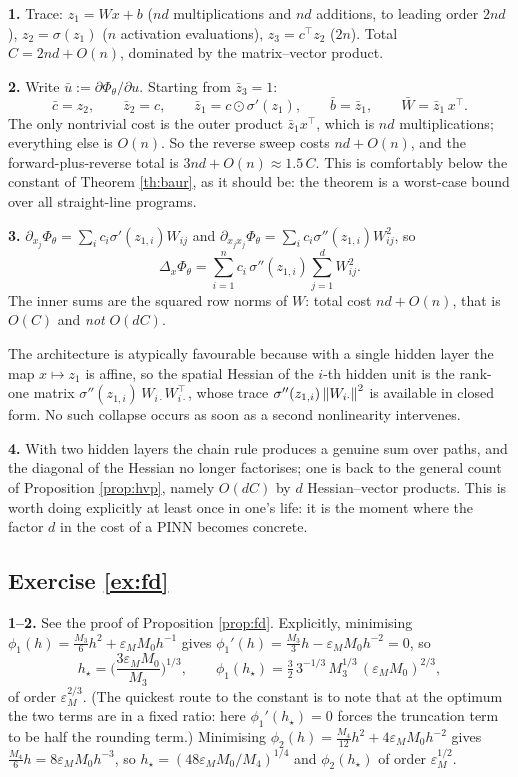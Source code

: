 \documentclass[11pt,a4paper]{article}
\begin{document}
\textbf{1.} Trace: $z_1 = Wx + b$ ($nd$ multiplications and $nd$ additions, to leading order $2nd$),
$z_2 = \sigma(z_1)$ ($n$ activation evaluations), $z_3 = c^{\!\top}z_2$ ($2n$). Total
$C = 2nd + O(n)$, dominated by the matrix--vector product.

\textbf{2.} Write $\bar u := \partial\Phi_\theta/\partial u$. Starting from $\bar z_3 = 1$:
\[
\bar c = z_2, \qquad \bar z_2 = c, \qquad \bar z_1 = c \odot \sigma'(z_1), \qquad
\bar b = \bar z_1, \qquad \bar W = \bar z_1\, x^{\!\top}.
\]
The only nontrivial cost is the outer product $\bar z_1 x^{\!\top}$, which is $nd$ multiplications;
everything else is $O(n)$. So the reverse sweep costs $nd + O(n)$, and the forward-plus-reverse
total is $3nd + O(n) \approx 1.5\,C$. This is comfortably below the constant of Theorem
\ref{th:baur}, as it should be: the theorem is a worst-case bound over all straight-line programs.

\textbf{3.} $\partial_{x_j}\Phi_\theta = \sum_i c_i \sigma'(z_{1,i})W_{ij}$ and
$\partial_{x_jx_j}\Phi_\theta = \sum_i c_i\sigma''(z_{1,i})W_{ij}^2$, so
\[
\Delta_x\Phi_\theta = \sum_{i=1}^n c_i\, \sigma''(z_{1,i}) \sum_{j=1}^d W_{ij}^2 .
\]
The inner sums are the squared row norms of $W$: total cost $nd + O(n)$, that is $O(C)$ and
\emph{not} $O(dC)$.

The architecture is atypically favourable because with a single hidden layer the map
$x \mapsto z_1$ is affine, so the spatial Hessian of the $i$-th hidden unit is the rank-one matrix
$\sigma''(z_{1,i})\,W_{i\cdot}W_{i\cdot}^{\!\top}$, whose trace
$\sigma''(z_{1,i})\left\lVert W_{i\cdot} \right\rVert^2$ is available in closed form. No such collapse occurs as
soon as a second nonlinearity intervenes.

\textbf{4.} With two hidden layers the chain rule produces a genuine sum over paths, and the
diagonal of the Hessian no longer factorises; one is back to the general count of Proposition
\ref{prop:hvp}, namely $O(dC)$ by $d$ Hessian--vector products. This is worth doing explicitly at
least once in one's life: it is the moment where the factor $d$ in the cost of a PINN becomes
concrete.

\subsection*{Exercise \ref{ex:fd}}

\textbf{1--2.} See the proof of Proposition \ref{prop:fd}. Explicitly, minimising
$\phi_1(h) = \tfrac{M_3}{6}h^2 + \varepsilon_{\!M}M_0h^{-1}$ gives
$\phi_1'(h) = \tfrac{M_3}{3}h - \varepsilon_{\!M}M_0h^{-2} = 0$, so
\[
h_\star = \Big(\frac{3\varepsilon_{\!M}M_0}{M_3}\Big)^{1/3},
\qquad
\phi_1(h_\star) = \tfrac{3}{2}\,3^{-1/3}\,M_3^{1/3}\,(\varepsilon_{\!M}M_0)^{2/3},
\]
of order $\varepsilon_{\!M}^{2/3}$. (The quickest route to the constant is to note that at the
optimum the two terms are in a fixed ratio: here $\phi_1'(h_\star)=0$ forces the truncation term to
be half the rounding term.) Minimising
$\phi_2(h) = \tfrac{M_4}{12}h^2 + 4\varepsilon_{\!M}M_0h^{-2}$ gives
$\tfrac{M_4}{6}h = 8\varepsilon_{\!M}M_0h^{-3}$, so
$h_\star = (48\varepsilon_{\!M}M_0/M_4)^{1/4}$ and $\phi_2(h_\star)$ of order
$\varepsilon_{\!M}^{1/2}$.
\end{document}
